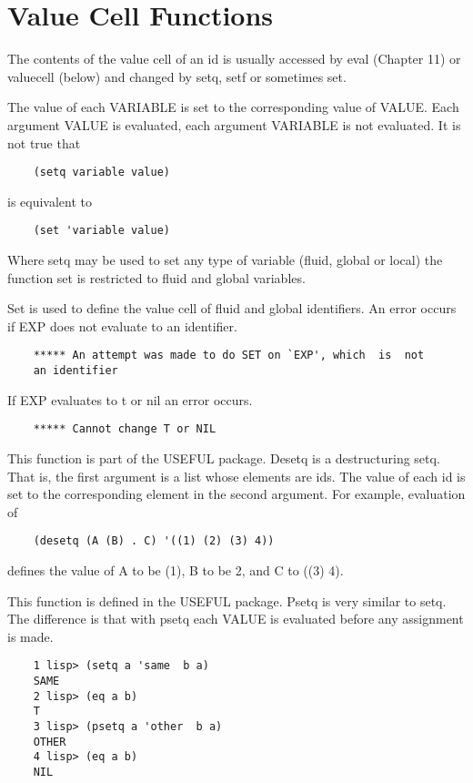 \section{Value Cell Functions}

The contents of the value cell of an id is usually accessed by
eval (Chapter 11) or valuecell (below) and changed by setq, setf
or sometimes set.

{    The value of each VARIABLE is set to the corresponding value
    of  VALUE.   Each argument VALUE is evaluated, each argument
    VARIABLE is not evaluated.  It is not true that
}
\begin{verbatim}
    (setq variable value)
\end{verbatim}
    is equivalent to

\begin{verbatim}
    (set 'variable value)
\end{verbatim}

				Where setq may be used to set any type of  variable  (fluid,
    global or local) the function set is restricted to fluid and
    global variables.


{    Set  is  used  to  define the value cell of fluid and global
    identifiers.  An error occurs if EXP does not evaluate to an
    identifier.
}
\begin{verbatim}
    ***** An attempt was made to do SET on `EXP', which  is  not
    an identifier
\end{verbatim}
    If EXP evaluates to t or nil an error occurs.
\begin{verbatim}
    ***** Cannot change T or NIL
\end{verbatim}
{    This  function  is  part of the USEFUL package.  Desetq is a
    destructuring setq.  That is, the first argument is  a  list
    whose  elements are ids.  The value of each id is set to the
    corresponding element in the second argument.  For  example,
    evaluation of}
\begin{verbatim}
    (desetq (A (B) . C) '((1) (2) (3) 4))
\end{verbatim}
    defines  the  value of A to be (1), B to be 2, and C to ((3)
    4).

{    This function is defined in the USEFUL package.    Psetq  is
    very  similar  to  setq.   The difference is that with psetq
    each VALUE is evaluated before any assignment is made.}
\begin{verbatim}
    1 lisp> (setq a 'same  b a)
    SAME
    2 lisp> (eq a b)
    T
    3 lisp> (psetq a 'other  b a)
    OTHER
    4 lisp> (eq a b)
    NIL
\end{verbatim}


